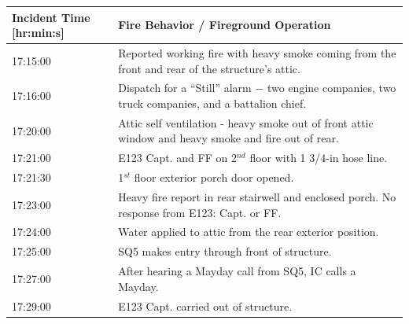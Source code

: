 \documentclass[11pt,oneside]{book}
\begin{document}
\begin{table}
\centering
{}\label{tab:fire_info}
\begin{tabular}{l l}
\toprule[1.5pt]
Incident Time [hr:min:s] & Fire Behavior / Fireground Operation  \\
\midrule
\multirow{2}{*}{17:15:00} & \multirow{2}{*}{\parbox{10cm} {Reported working fire with heavy smoke coming from the front and rear of the structure's attic.}} \\ 
         & \\[.25cm] %
\multirow{2}{*}{17:16:00}    &  \multirow{2}{*}{\parbox{10cm} {Dispatch for a ``Still'' alarm $-$ two engine companies, two truck companies, and a battalion chief.}} \\
         & \\[.25cm]
\multirow{2}{*}{17:20:00}    & \multirow{2}{*}{\parbox{10cm} {Attic self ventilation - heavy smoke out of front attic window and heavy smoke and fire out of rear.}} \\
         & \\[.25cm] 
17:21:00 & E123 Capt. and FF on 2$^{nd}$ floor with 1 3/4-in hose line. \\[.25cm]
17:21:30 & 1$^{st}$ floor exterior porch door opened. \\[.25cm]
\multirow{2}{*}{17:23:00}    & \multirow{2}{*}{\parbox{10cm} {Heavy fire report in rear stairwell and enclosed porch. No response from E123: Capt. or FF.}} \\
         & \\[.25cm]
17:24:00    & Water applied to attic from the rear exterior position. \\[.25cm]
17:25:00    & SQ5 makes entry through front of structure. \\[.25cm]
17:27:00    & After hearing a Mayday call from SQ5, IC calls a Mayday. \\[.25cm]
17:29:00    & E123 Capt. carried out of structure. \\
\bottomrule[1.25pt]
\end{tabular}\par
\end{table}
 
\end{document}
